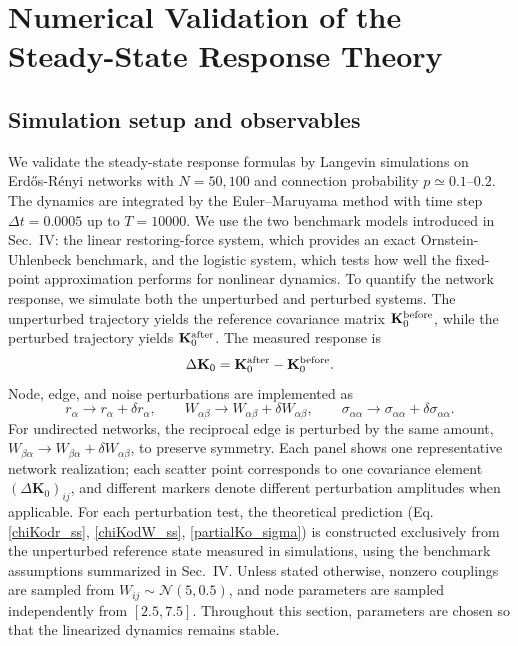 \section{Numerical Validation of the Steady-State Response Theory}
\subsection{Simulation setup and observables}
\quad We validate the steady-state response formulas by Langevin simulations on Erd\H{o}s-R\'enyi networks with $N=50,100$ and connection probability $p\simeq 0.1$--$0.2$. The dynamics are integrated by the Euler--Maruyama method with time step $\Delta t=0.0005$ up to $T=10000$. We use the two benchmark models introduced in Sec.~IV: the linear restoring-force system, which provides an exact Ornstein-Uhlenbeck benchmark, and the logistic system, which tests how well the fixed-point approximation performs for nonlinear dynamics. To quantify the network response, we simulate both the unperturbed and perturbed systems. The unperturbed trajectory yields the reference covariance matrix $\mathbf{K}_0^{\rm before}$, while the perturbed trajectory yields $\mathbf{K}_0^{\rm after}$. The measured response is
\begin{equation}
    \Delta \mathbf{K}_0 = \mathbf{K}_0^{\rm after}-\mathbf{K}_0^{\rm before} .
\end{equation}
Node, edge, and noise perturbations are implemented as
\begin{equation}
    r_\alpha\to r_\alpha+\delta r_\alpha,\qquad
    W_{\alpha\beta}\to W_{\alpha\beta}+\delta W_{\alpha\beta},
    \qquad
    \sigma_{\alpha\alpha}\to \sigma_{\alpha\alpha}+\delta\sigma_{\alpha\alpha}.
\end{equation}
For undirected networks, the reciprocal edge is perturbed by the same amount,
$W_{\beta\alpha}\to W_{\beta\alpha}+\delta W_{\alpha\beta}$, to preserve symmetry. Each panel shows one representative network realization; each scatter point corresponds to one covariance element $(\Delta\mathbf{K}_0)_{ij}$, and different markers denote different perturbation amplitudes when applicable. For each perturbation test, the theoretical prediction (Eq. \ref{chiKodr_ss}, \ref{chiKodW_ss}, \ref{partialKo_sigma}) is constructed exclusively from the unperturbed reference state measured in simulations, using the benchmark assumptions summarized in Sec.~IV. Unless stated otherwise, nonzero couplings are sampled from $W_{ij}\sim\mathcal{N}(5,0.5)$, and node parameters are sampled independently from $[2.5,7.5]$. Throughout this section, parameters are chosen so that the linearized dynamics remains stable.
